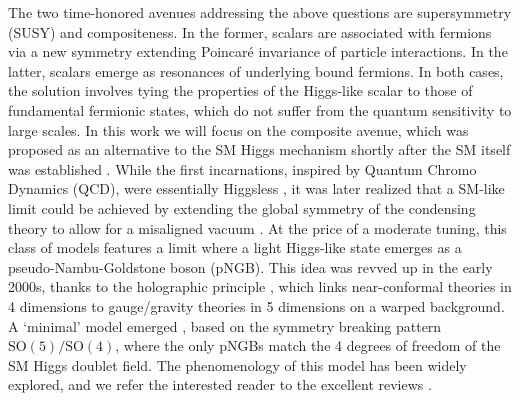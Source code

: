 \documentclass[preprintnumbers,nofootinbib,showpacs,eqsecnum,pre,12pt]{revtex4-1}
\newcommand{\SO}{\text{SO}}
\begin{document}
The two time-honored avenues addressing the above questions are supersymmetry (SUSY) and compositeness. In the former, scalars are associated with fermions via a new symmetry extending Poincar\'e invariance of particle interactions. In the latter, scalars emerge as resonances of underlying bound fermions. In both cases, the solution involves tying the properties of the Higgs-like scalar to those of fundamental fermionic states, which do not suffer from the quantum sensitivity to large scales. In this work we will focus on the composite avenue, which was proposed as an alternative to the SM Higgs mechanism shortly after the SM itself was established \cite{Weinberg:1975gm,Susskind:1978ms}. While the first incarnations, inspired by Quantum Chromo Dynamics (QCD), were essentially Higgsless \cite{Yamawaki:1985zg,Sannino:2004qp,Hong:2004td}, it was later realized that a SM-like limit could be achieved by extending the global symmetry of the condensing theory to allow for a misaligned vacuum \cite{Kaplan:1983fs}. At the price of a moderate tuning, this class of models features a limit where a light Higgs-like state emerges as a pseudo-Nambu-Goldstone boson (pNGB). This idea was revved up in the early 2000s, thanks to the holographic principle \cite{Contino:2003ve}, which links near-conformal theories in 4 dimensions to gauge/gravity theories in 5 dimensions on a warped background. A `minimal' model emerged \cite{Agashe:2004rs,Agashe:2005dk}, based on the symmetry breaking pattern $\SO(5)/\SO(4)$, where the only pNGBs match the 4 degrees of freedom of the SM Higgs doublet field. The phenomenology of this model has been widely explored, and we refer the interested reader to the excellent reviews \cite{Contino:2010rs,Bellazzini:2014yua,Panico:2015jxa}. 
\end{document}

